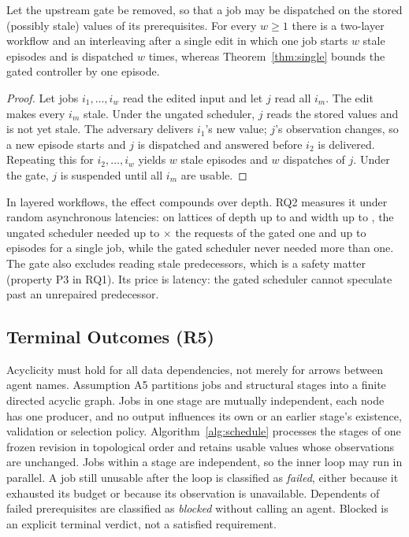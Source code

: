 \begin{proposition}\label{prop:eager}
Let the upstream gate be removed, so that a job may be dispatched on the stored (possibly stale) values of its prerequisites. For every $w\ge1$ there is a two-layer workflow and an interleaving after a single edit in which one job starts $w$ stale episodes and is dispatched $w$ times, whereas Theorem~\ref{thm:single} bounds the gated controller by one episode.
\end{proposition}
\begin{proof}
Let jobs $i_1,\ldots,i_w$ read the edited input and let $j$ read all $i_m$. The edit makes every $i_m$ stale. Under the ungated scheduler, $j$ reads the stored values and is not yet stale. The adversary delivers $i_1$'s new value; $j$'s observation changes, so a new episode starts and $j$ is dispatched and answered before $i_2$ is delivered. Repeating this for $i_2,\ldots,i_w$ yields $w$ stale episodes and $w$ dispatches of $j$. Under the gate, $j$ is suspended until all $i_m$ are usable.
\end{proof}

In layered workflows, the effect compounds over depth. RQ2 measures it under random asynchronous latencies: on lattices of depth up to \SchedMaxDepth{} and width up to \SchedMaxWidth, the ungated scheduler needed up to \SchedEagerReqRatioMax$\times$ the requests of the gated one and up to \SchedEagerMaxEpisodes{} episodes for a single job, while the gated scheduler never needed more than one. The gate also excludes reading stale predecessors, which is a safety matter (property P3 in RQ1). Its price is latency: the gated scheduler cannot speculate past an unrepaired predecessor.

\subsection{Terminal Outcomes (R5)}
Acyclicity must hold for all data dependencies, not merely for arrows between agent names. Assumption A5 partitions jobs and structural stages into a finite directed acyclic graph. Jobs in one stage are mutually independent, each node has one producer, and no output influences its own or an earlier stage's existence, validation or selection policy. Algorithm~\ref{alg:schedule} processes the stages of one frozen revision in topological order and retains usable values whose observations are unchanged. Jobs within a stage are independent, so the inner loop may run in parallel. A job still unusable after the loop is classified as \emph{failed}, either because it exhausted its budget or because its observation is unavailable. Dependents of failed prerequisites are classified as \emph{blocked} without calling an agent. Blocked is an explicit terminal verdict, not a satisfied requirement.

